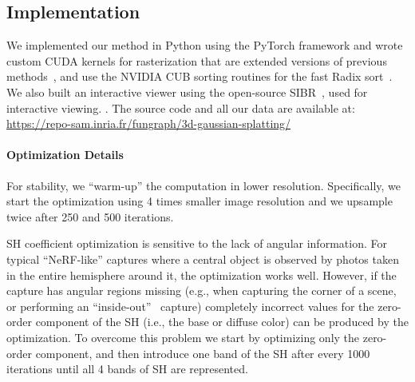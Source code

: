 \subsection{Implementation}
\label{sec:impl}


We implemented our method in Python using the PyTorch framework and wrote custom CUDA kernels for rasterization that are extended versions of previous methods~\cite{kopanas21}, and use the NVIDIA CUB sorting routines for the fast Radix sort~\cite{merrill2010revisiting}.
We also built an interactive viewer using the open-source SIBR~\cite{sibr2020}, used for interactive viewing. .
The source code and all our data are available at: \textcolor{blue}{\url{https://repo-sam.inria.fr/fungraph/3d-gaussian-splatting/}}


\paragraph{Optimization Details}
For stability, we ``warm-up'' the computation in lower resolution.
Specifically, we start the optimization using 4 times smaller image resolution and we upsample twice after 250 and 500 iterations.

SH coefficient optimization is sensitive to the lack of angular information. For typical ``NeRF-like''
captures where a central object is observed by photos taken in the entire hemisphere around it, the optimization works well. However, if the capture has angular regions missing (e.g., when capturing the corner of a scene, or performing an ``inside-out''~\cite{HRDB16} capture) completely incorrect values for the zero-order component of the SH (i.e., the base or diffuse color) can be produced by the optimization.
To overcome this problem we start by optimizing only the zero-order component, and then introduce one band of the SH after every 1000 iterations until all 4 bands of SH are represented. %


